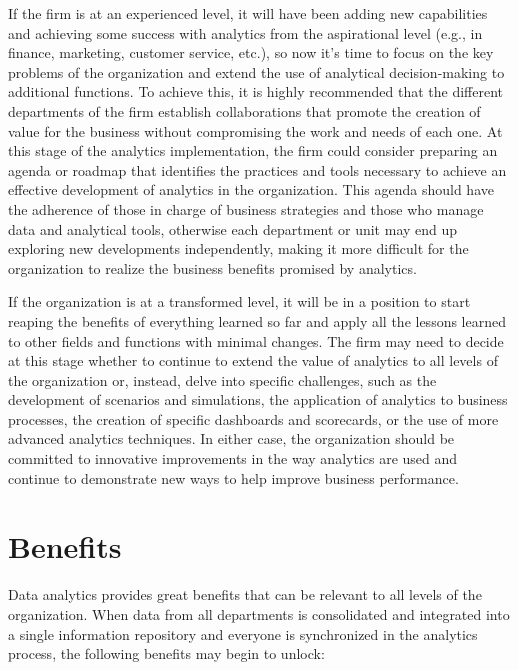 \documentclass[
  letterpaper,
  DIV=11,
  numbers=noendperiod]{scrreprt}
\begin{document}
If the firm is at an experienced level, it will have been adding new
capabilities and achieving some success with analytics from the
aspirational level (e.g., in finance, marketing, customer service,
etc.), so now it's time to focus on the key problems of the organization
and extend the use of analytical decision-making to additional
functions. To achieve this, it is highly recommended that the different
departments of the firm establish collaborations that promote the
creation of value for the business without compromising the work and
needs of each one. At this stage of the analytics implementation, the
firm could consider preparing an agenda or roadmap that identifies the
practices and tools necessary to achieve an effective development of
analytics in the organization. This agenda should have the adherence of
those in charge of business strategies and those who manage data and
analytical tools, otherwise each department or unit may end up exploring
new developments independently, making it more difficult for the
organization to realize the business benefits promised by analytics.

If the organization is at a transformed level, it will be in a position
to start reaping the benefits of everything learned so far and apply all
the lessons learned to other fields and functions with minimal changes.
The firm may need to decide at this stage whether to continue to extend
the value of analytics to all levels of the organization or, instead,
delve into specific challenges, such as the development of scenarios and
simulations, the application of analytics to business processes, the
creation of specific dashboards and scorecards, or the use of more
advanced analytics techniques. In either case, the organization should
be committed to innovative improvements in the way analytics are used
and continue to demonstrate new ways to help improve business
performance.

\hypertarget{benefits-1}{%
\section{Benefits}\label{benefits-1}}

Data analytics provides great benefits that can be relevant to all
levels of the organization. When data from all departments is
consolidated and integrated into a single information repository and
everyone is synchronized in the analytics process, the following
benefits may begin to unlock:
\end{document}
